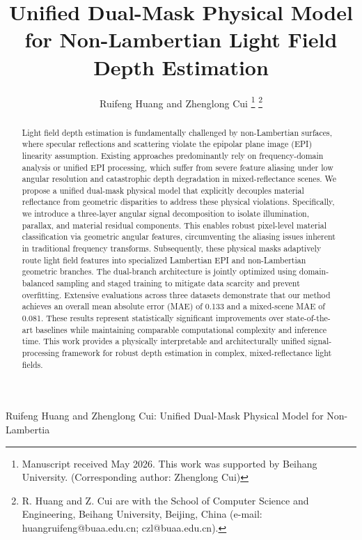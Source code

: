\documentclass[lettersize,journal]{IEEEtran}
\begin{document}
\title{Unified Dual-Mask Physical Model for Non-Lambertian Light Field Depth Estimation}

\author{Ruifeng Huang and Zhenglong Cui
\thanks{Manuscript received May 2026. This work was supported by Beihang University. (Corresponding author: Zhenglong Cui)}
\thanks{R. Huang and Z. Cui are with the School of Computer Science and Engineering, Beihang University, Beijing, China (e-mail: huangruifeng@buaa.edu.cn; czl@buaa.edu.cn).}}

%
{Ruifeng Huang and Zhenglong Cui: Unified Dual-Mask Physical Model for Non-Lambertia}

\maketitle

\begin{abstract}
Light field depth estimation is fundamentally challenged by non-Lambertian surfaces, where specular reflections and scattering violate the epipolar plane image (EPI) linearity assumption. Existing approaches predominantly rely on frequency-domain analysis or unified EPI processing, which suffer from severe feature aliasing under low angular resolution and catastrophic depth degradation in mixed-reflectance scenes. We propose a unified dual-mask physical model that explicitly decouples material reflectance from geometric disparities to address these physical violations. Specifically, we introduce a three-layer angular signal decomposition to isolate illumination, parallax, and material residual components. This enables robust pixel-level material classification via geometric angular features, circumventing the aliasing issues inherent in traditional frequency transforms. Subsequently, these physical masks adaptively route light field features into specialized Lambertian EPI and non-Lambertian geometric branches. The dual-branch architecture is jointly optimized using domain-balanced sampling and staged training to mitigate data scarcity and prevent overfitting. Extensive evaluations across three datasets demonstrate that our method achieves an overall mean absolute error (MAE) of 0.133 and a mixed-scene MAE of 0.081. These results represent statistically significant improvements over state-of-the-art baselines while maintaining comparable computational complexity and inference time. This work provides a physically interpretable and architecturally unified signal-processing framework for robust depth estimation in complex, mixed-reflectance light fields.
\end{abstract}
\end{document}
